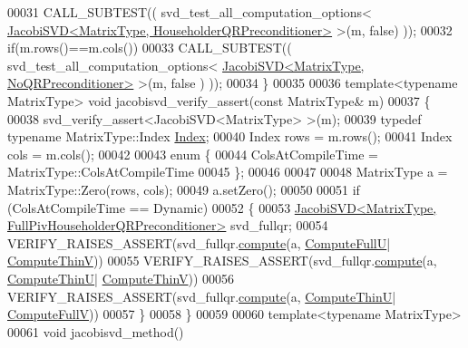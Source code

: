 \begin{DoxyCode}
00031   CALL\_SUBTEST(( svd\_test\_all\_computation\_options<
      \hyperlink{group___s_v_d___module_class_eigen_1_1_jacobi_s_v_d}{JacobiSVD<MatrixType, HouseholderQRPreconditioner>}       
       >(m, \textcolor{keyword}{false}) ));
00032   \textcolor{keywordflow}{if}(m.rows()==m.cols())
00033     CALL\_SUBTEST(( svd\_test\_all\_computation\_options<
      \hyperlink{group___s_v_d___module_class_eigen_1_1_jacobi_s_v_d}{JacobiSVD<MatrixType, NoQRPreconditioner>}               >(m, \textcolor{keyword}{false}
      ) ));
00034 \}
00035 
00036 \textcolor{keyword}{template}<\textcolor{keyword}{typename} MatrixType> \textcolor{keywordtype}{void} jacobisvd\_verify\_assert(\textcolor{keyword}{const} MatrixType& m)
00037 \{
00038   svd\_verify\_assert<JacobiSVD<MatrixType> >(m);
00039   \textcolor{keyword}{typedef} \textcolor{keyword}{typename} MatrixType::Index \hyperlink{namespace_eigen_a62e77e0933482dafde8fe197d9a2cfde}{Index};
00040   Index rows = m.rows();
00041   Index cols = m.cols();
00042 
00043   \textcolor{keyword}{enum} \{
00044     ColsAtCompileTime = MatrixType::ColsAtCompileTime
00045   \};
00046 
00047 
00048   MatrixType a = MatrixType::Zero(rows, cols);
00049   a.setZero();
00050 
00051   \textcolor{keywordflow}{if} (ColsAtCompileTime == Dynamic)
00052   \{
00053     \hyperlink{group___s_v_d___module_class_eigen_1_1_jacobi_s_v_d}{JacobiSVD<MatrixType, FullPivHouseholderQRPreconditioner>}
       svd\_fullqr;
00054     VERIFY\_RAISES\_ASSERT(svd\_fullqr.\hyperlink{group___s_v_d___module_a5dab376cc86cf0d36674bcdad4af3f5a}{compute}(a, \hyperlink{group__enums_ggae3e239fb70022eb8747994cf5d68b4a9a2b4f91ca5859a4159dbfe8090043817f}{ComputeFullU}|
      \hyperlink{group__enums_ggae3e239fb70022eb8747994cf5d68b4a9a1055e53fa95c8ae04a07ebb72cfafd95}{ComputeThinV}))
00055     VERIFY\_RAISES\_ASSERT(svd\_fullqr.\hyperlink{group___s_v_d___module_a5dab376cc86cf0d36674bcdad4af3f5a}{compute}(a, \hyperlink{group__enums_ggae3e239fb70022eb8747994cf5d68b4a9af8c742a1aa87773e165eae406c9ccaf8}{ComputeThinU}|
      \hyperlink{group__enums_ggae3e239fb70022eb8747994cf5d68b4a9a1055e53fa95c8ae04a07ebb72cfafd95}{ComputeThinV}))
00056     VERIFY\_RAISES\_ASSERT(svd\_fullqr.\hyperlink{group___s_v_d___module_a5dab376cc86cf0d36674bcdad4af3f5a}{compute}(a, \hyperlink{group__enums_ggae3e239fb70022eb8747994cf5d68b4a9af8c742a1aa87773e165eae406c9ccaf8}{ComputeThinU}|
      \hyperlink{group__enums_ggae3e239fb70022eb8747994cf5d68b4a9a52c6f7e80bbf9a42297c88f700245b51}{ComputeFullV}))
00057   \}
00058 \}
00059 
00060 template<typename MatrixType>
00061 \textcolor{keywordtype}{void} jacobisvd\_method()

\end{DoxyCode}
